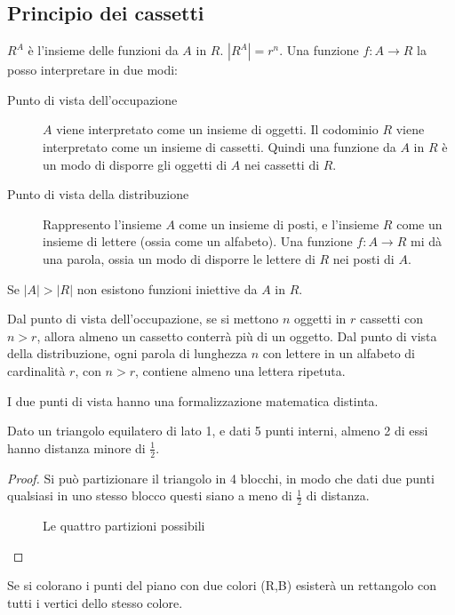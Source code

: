 \subsection{Principio dei cassetti}

$R^A$ \`e l'insieme delle funzioni da $A$ in $R$. $|R^A| = r^n$. Una funzione $f : A \to R$ la posso interpretare in due modi:
\begin{description}
  \item[Punto di vista dell'occupazione] $A$ viene interpretato come un insieme di oggetti. Il codominio $R$ viene interpretato come un insieme di cassetti. Quindi una funzione da $A$ in $R$ \`e un modo di disporre gli oggetti di $A$ nei cassetti di $R$.
  \item[Punto di vista della distribuzione] Rappresento l'insieme $A$ come un insieme di posti, e l'insieme $R$ come un insieme di lettere (ossia come un alfabeto). Una funzione $f : A \to R$ mi d\`a una parola, ossia un modo di disporre le lettere di $R$ nei posti di $A$.
\end{description}
\begin{prop}
Se $|A| > |R|$ non esistono funzioni iniettive da $A$ in $R$.

Dal punto di vista dell'occupazione, se si mettono $n$ oggetti in $r$ cassetti con $n > r$, allora almeno un cassetto conterr\`a pi\`u di un oggetto. Dal punto di vista della distribuzione, ogni parola di lunghezza $n$ con lettere in un alfabeto di cardinalit\`a $r$, con $n > r$, contiene almeno una lettera ripetuta.
\end{prop}
I due punti di vista hanno una formalizzazione matematica distinta.

Dato un triangolo equilatero di lato 1, e dati 5 punti interni, almeno 2 di essi hanno distanza minore di $\frac{1}{2}$.
\begin{proof}
Si pu\`o partizionare il triangolo in 4 blocchi, in modo che dati due punti qualsiasi in uno stesso blocco questi siano a meno di $\frac{1}{2}$ di distanza.
\begin{figure}[ht]
\centering
{}
\caption{Le quattro partizioni possibili}
\end{figure}
\end{proof}

Se si colorano i punti del piano con due colori (R,B) esisterà un rettangolo con tutti i vertici dello stesso colore.

